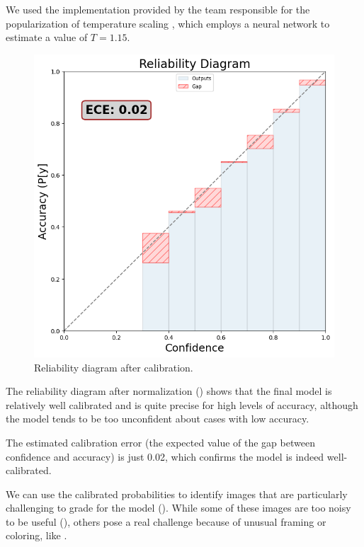 We used the implementation provided by the team responsible for the popularization of temperature scaling \cite{guo2017calibration}, which employs a neural network to estimate a value of \( T = 1.15 \).

\begin{figure}[tbp]
    \centering
    \includegraphics[scale = 0.45]{figures/chapter5/calibration/post_calibration.png}
    \caption{Reliability diagram after calibration. }
    \label{fig:reliability}
\end{figure}

The reliability diagram after normalization () shows that the final model is relatively well calibrated and is quite precise for high levels of accuracy, although the model tends to be too unconfident about cases with low accuracy. 

The estimated calibration error (the expected value of the gap between confidence and accuracy) is just 0.02, which confirms the model is indeed well-calibrated.

We can use the calibrated probabilities to identify images that are particularly challenging to grade for the model (). While some of these images are too noisy to be useful (), others pose a real challenge because of unusual framing or coloring, like . 


